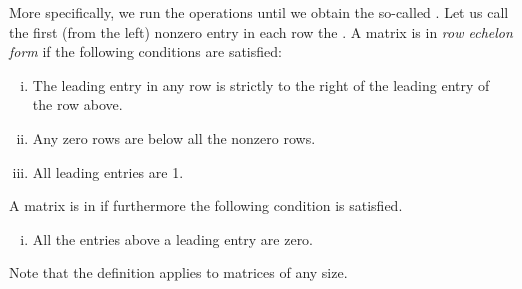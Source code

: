 More specifically, we run the operations until we obtain the so-called
\emph{}.
Let us call
the first (from the left) nonzero entry in each row the
\emph{}.
A matrix is in \emph{row echelon form} if
the following conditions are satisfied:
\begin{enumerate}[(i)]
\item The leading entry in any row is strictly to the right of
the leading entry of the row above.
\item Any zero rows are below all the nonzero rows.
\item All leading entries are 1.
\end{enumerate}
A matrix is in \emph{}
if furthermore the following condition is satisfied.
\begin{enumerate}[(i),resume]
\item All the entries above a leading entry are zero.
\end{enumerate}

Note that the definition applies to matrices of any size.

